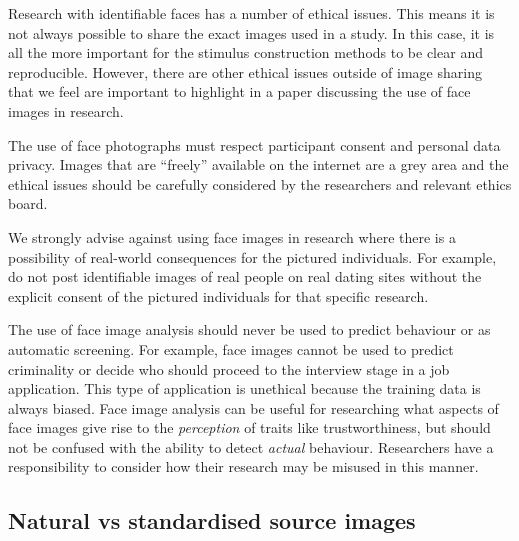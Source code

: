 \documentclass[
  man,floatsintext]{apa6}
\begin{document}
Research with identifiable faces has a number of ethical issues. This means it is not always possible to share the exact images used in a study. In this case, it is all the more important for the stimulus construction methods to be clear and reproducible. However, there are other ethical issues outside of image sharing that we feel are important to highlight in a paper discussing the use of face images in research.

The use of face photographs must respect participant consent and personal data privacy. Images that are ``freely'' available on the internet are a grey area and the ethical issues should be carefully considered by the researchers and relevant ethics board.

We strongly advise against using face images in research where there is a possibility of real-world consequences for the pictured individuals. For example, do not post identifiable images of real people on real dating sites without the explicit consent of the pictured individuals for that specific research.

The use of face image analysis should never be used to predict behaviour or as automatic screening. For example, face images cannot be used to predict criminality or decide who should proceed to the interview stage in a job application. This type of application is unethical because the training data is always biased. Face image analysis can be useful for researching what aspects of face images give rise to the \emph{perception} of traits like trustworthiness, but should not be confused with the ability to detect \emph{actual} behaviour. Researchers have a responsibility to consider how their research may be misused in this manner.

\hypertarget{natural-vs-standardised-source-images}{%
\subsection{Natural vs standardised source images}\label{natural-vs-standardised-source-images}}
\end{document}
